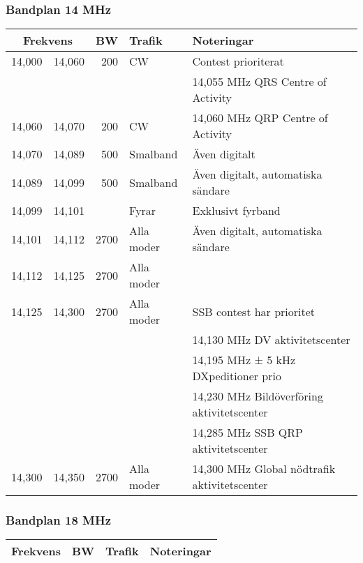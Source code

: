 \begin{landscape}
\subsubsection{Bandplan 14 MHz}
\begin{tabular}{rrrll}
\multicolumn{2}{c}{\textbf{Frekvens}} &  \textbf{BW} & \textbf{Trafik} & \textbf{Noteringar} \\ \hline

14,000 & 14,060 & 200  & CW         & Contest prioriterat                          \\
       &        &      &            & 14,055 MHz QRS Centre of Activity            \\ \hline
14,060 & 14,070 & 200  & CW         & 14,060 MHz QRP Centre of Activity            \\ \hline
14,070 & 14,089 & 500  & Smalband   & Även digitalt                                \\ \hline
14,089 & 14,099 & 500  & Smalband   & Även digitalt, automatiska sändare           \\ \hline
14,099 & 14,101 &      & Fyrar      & Exklusivt fyrband                            \\ \hline
14,101 & 14,112 & 2700 & Alla moder & Även digitalt, automatiska sändare           \\ \hline
14,112 & 14,125 & 2700 & Alla moder &                                              \\ \hline
14,125 & 14,300 & 2700 & Alla moder & SSB contest har prioritet                    \\ 
       &        &      &            & 14,130 MHz DV aktivitetscenter               \\
       &        &      &            & 14,195 MHz ± 5 kHz DXpeditioner prio         \\
       &        &      &            & 14,230 MHz Bildöverföring aktivitetscenter   \\
       &        &      &            & 14,285 MHz SSB QRP aktivitetscenter          \\ \hline
14,300 & 14,350 & 2700 & Alla moder & 14,300 MHz Global nödtrafik aktivitetscenter \\ \hline
\end{tabular}
\clearpage

\subsubsection{Bandplan 18 MHz}
\begin{tabular}{rrrll}
\multicolumn{2}{c}{\textbf{Frekvens}} &  \textbf{BW} & \textbf{Trafik} & \textbf{Noteringar} \\ \hline


\end{tabular}
\end{landscape}
